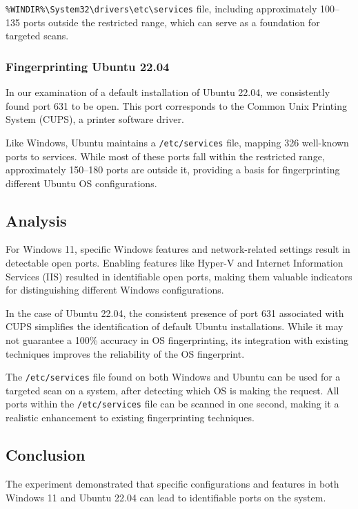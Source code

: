 \texttt{\%WINDIR\%\textbackslash System32\textbackslash drivers\textbackslash etc\textbackslash services} file, including approximately 100–135 ports outside the restricted range, which can serve as a foundation for targeted scans.

\subsubsection{Fingerprinting Ubuntu 22.04}

In our examination of a default installation of Ubuntu 22.04, we consistently found port 631 to be open. This port corresponds to the Common Unix Printing System (CUPS), a printer software driver.

Like Windows, Ubuntu maintains a \texttt{/etc/services} file, mapping 326 well-known ports to services. While most of these ports fall within the restricted range, approximately 150–180 ports are outside it, providing a basis for fingerprinting different Ubuntu OS configurations.

\subsection{Analysis}

For Windows 11, specific Windows features and network-related settings result in detectable open ports. Enabling features like Hyper-V and Internet Information Services (IIS) resulted in identifiable open ports, making them valuable indicators for distinguishing different Windows configurations. 

In the case of Ubuntu 22.04, the consistent presence of port 631 associated with CUPS simplifies the identification of default Ubuntu installations.  While it may not guarantee a 100\% accuracy in OS fingerprinting, its integration with existing techniques improves the reliability of the OS fingerprint. 

The \texttt{/etc/services} file found on both Windows and Ubuntu can be used for a targeted scan on a system, after detecting which OS is making the request. All ports within the \texttt{/etc/services} file can be scanned in one second, making it a realistic enhancement to existing fingerprinting techniques.  

\subsection{Conclusion}

The experiment demonstrated that specific configurations and features in both Windows 11 and Ubuntu 22.04 can lead to identifiable ports on the system.

